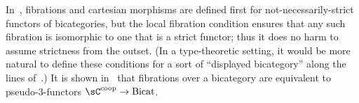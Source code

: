 \documentclass{amsart}
\begin{document}
\begin{defn}
\begin{itemize}
  \end{itemize}
\end{defn}

In~\cite{buckley:2fib}, fibrations and cartesian morphisms are defined first for not-necessarily-strict functors of bicategories, but the local fibration condition ensures that any such fibration is isomorphic to one that is a strict functor; thus it does no harm to assume strictness from the outset.
(In a type-theoretic setting, it would be more natural to define these conditions for a sort of ``displayed bicategory'' along the lines of~\cite{al:displayed}.)
It is shown in~\cite[Theorem 3.3.12]{buckley:2fib} that fibrations over a bicategory \sC are equivalent to pseudo-3-functors $\sC\coop\to \mathrm{Bicat}$.

\end{document}
